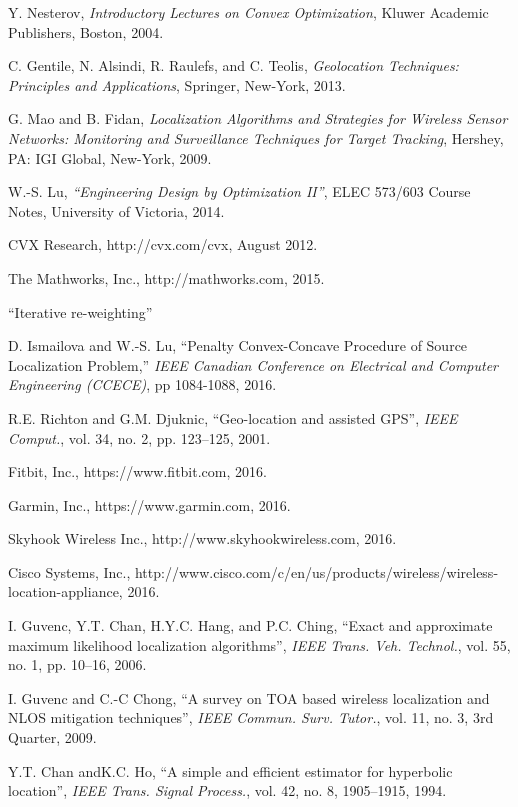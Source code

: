 \begin{thebibliography}{99}
Y. Nesterov, {\em Introductory Lectures on Convex Optimization}, Kluwer Academic Publishers, Boston, 2004.

C. Gentile, N. Alsindi, R. Raulefs, and C. Teolis, {\em Geolocation Techniques: Principles and Applications}, Springer, New-York, 2013.

G. Mao and B. Fidan, {\em Localization Algorithms and Strategies for Wireless Sensor Networks: Monitoring and Surveillance Techniques for Target Tracking},  Hershey, PA: IGI Global, New-York, 2009.

W.-S. Lu, {\em ``Engineering Design by Optimization II''}, ELEC 573/603 Course Notes, University of Victoria, 2014.

CVX Research, http://cvx.com/cvx, August 2012.

The Mathworks, Inc., http://mathworks.com, 2015.

``Iterative re-weighting''

D. Ismailova and W.-S. Lu, ``Penalty Convex-Concave Procedure of Source Localization Problem,'' {\em IEEE Canadian Conference on Electrical and Computer Engineering (CCECE)}, pp 1084-1088, 2016.

R.E. Richton and G.M. Djuknic, ``Geo-location and assisted GPS'', {\em IEEE Comput.}, vol. 34, no. 2, pp. 123--125, 2001.

Fitbit, Inc.,  https://www.fitbit.com, 2016.

Garmin, Inc.,  https://www.garmin.com, 2016.

Skyhook Wireless Inc., http://www.skyhookwireless.com, 2016.

Cisco Systems, Inc., http://www.cisco.com/c/en/us/products/wireless/wireless-location-appliance, 2016.

I. Guvenc, Y.T. Chan, H.Y.C. Hang, and P.C. Ching, ``Exact and approximate maximum likelihood localization algorithms'', {\em IEEE Trans. Veh. Technol.}, vol. 55, no. 1, pp. 10--16, 2006.

I. Guvenc and C.-C Chong, ``A survey on TOA based wireless localization and NLOS mitigation techniques'', {\em IEEE Commun. Surv. Tutor.}, vol. 11, no. 3, 3rd Quarter, 2009.

Y.T. Chan andK.C. Ho, ``A simple and efficient estimator for hyperbolic location'', {\em IEEE Trans. Signal
Process.}, vol. 42, no. 8, 1905--1915, 1994.


\end{thebibliography}
